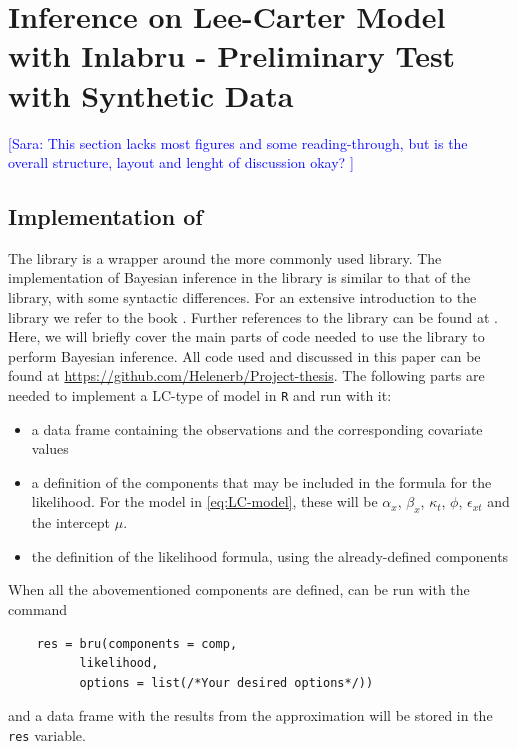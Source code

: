 \newpage
\section{Inference on Lee-Carter Model with Inlabru - Preliminary Test with Synthetic Data}
\textcolor{blue}{[Sara: This section lacks most figures and some reading-through, but is the overall structure, layout and lenght of discussion okay? ]}
\subsection{Implementation of \inlabru}
The \inlabru library is a wrapper around the more commonly used \rinla library. The implementation of Bayesian inference in the \inlabru library is similar to that of the \rinla library, with some syntactic differences. For an extensive introduction to the \rinla library we refer to the book \cite{Rubio2020}. Further references to the \inlabru library can be found at \cite{Inlabru}. Here, we will briefly cover the main parts of code needed to use the \inlabru library to perform Bayesian inference. All code used and discussed in this paper can be found at \url{https://github.com/Helenerb/Project-thesis}. 
\newline
\noindent The following parts are needed to implement a LC-type of model in \texttt{R} and run \inlabru with it:
\begin{itemize}
    \item a data frame containing the observations and the corresponding covariate values
    \item a definition of the components that may be included in the formula for the likelihood. For the model in \ref{eq:LC-model}, these will be $\alpha_x$, $\beta_x$, $\kappa_t$, $\phi$, $\epsilon_{xt}$ and the intercept $\mu$.
    \item the definition of the likelihood formula, using the already-defined components
\end{itemize}
When all the abovementioned components are defined, \inlabru can be run with the command 
\begin{verbatim}
    res = bru(components = comp,
          likelihood, 
          options = list(/*Your desired options*/))
\end{verbatim}
and a data frame with the results from the approximation will be stored in the \texttt{res} variable. 
\newline
